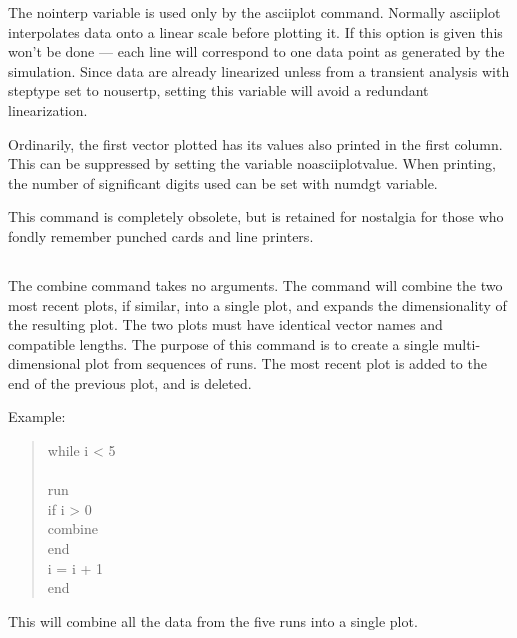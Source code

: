 The {\et nointerp} variable is used only by the {\cb asciiplot}
command.  Normally {\cb asciiplot} interpolates data onto a linear
scale before plotting it.  If this option is given this won't be done
--- each line will correspond to one data point as generated by the
simulation.  Since data are already linearized unless from a transient
analysis with {\et steptype} set to {\vt nousertp}, setting this
variable will avoid a redundant linearization.

Ordinarily, the first vector plotted has its values also printed in
the first column.  This can be suppressed by setting the variable {\et
noasciiplotvalue}.  When printing, the number of significant digits
used can be set with {\et numdgt} variable.

This command is completely obsolete, but is retained for nostalgia for
those who fondly remember punched cards and line printers.

\subsection{}


The {\cb combine} command takes no arguments.  The command will
combine the two most recent plots, if similar, into a single plot, and
expands the dimensionality of the resulting plot.  The two plots must
have identical vector names and compatible lengths.  The purpose of
this command is to create a single multi-dimensional plot from
sequences of runs.  The most recent plot is added to the end of the
previous plot, and is deleted.

Example:
\begin{quote}
{\vt\raggedright
while i < 5\\
\\
\qquad run\\
\qquad if i > 0\\
\qquad\qquad combine\\
\qquad end\\
\qquad i = i + 1\\
end}
\end{quote}

This will combine all the data from the five runs into a single
plot.

\subsection{}

